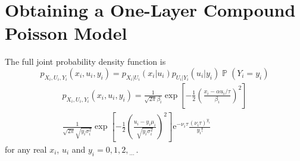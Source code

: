 \documentclass[12pt]{report}
\DeclareMathOperator{\prob}{\mathbb{P}}
\newcommand{\euler}{\mathrm{e}}
\newcommand{\dotdotdot}{_{\phantom{.}\cdots}}
\begin{document}
\section{Obtaining a One-Layer Compound Poisson Model}\label{chapter:oneLayer_compoundPoisson}
The full joint probability density function is
\begin{equation*}
p_{X_i,U_i,Y_i}\left(x_i,u_i,y_i\right)=
p_{X_i|U_i}(x_i|u_i)p_{U_i|Y_i}(u_i|y_i)\prob(Y_i=y_i)
\end{equation*}
\begin{multline}
p_{X_i,U_i,Y_i}\left(x_i,u_i,y_i\right)=
\frac{1}{\sqrt{2\pi}\beta_i}\exp\left[-\frac{1}{2}\left(\frac{x_i-\alpha u_i /\tau}{\beta_i}\right)^2\right]
\\
\frac{1}{\sqrt{2\pi}\sqrt{y_i\sigma_i^2}}\exp\left[-\frac{1}{2}\left(\frac{u_i-y_i\mu_i}{\sqrt{y_i\sigma_i^2}}\right)^2\right]
\euler^{-\nu_i\tau}\frac{(\nu_i\tau)^{y_i}}{y_i!}
\end{multline}
for any real $x_i$, $u_i$ and $y_i=0,1,2,\dotdotdot$.
\end{document}
